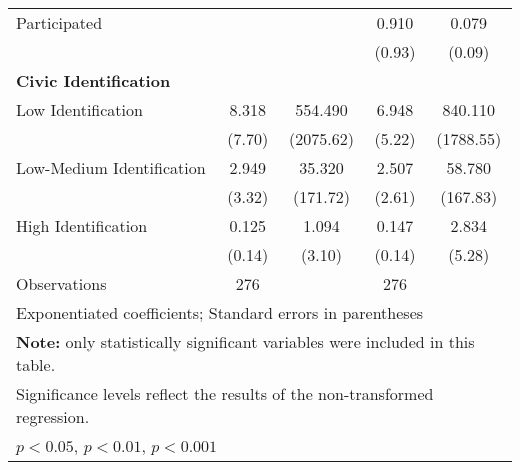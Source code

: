 \begin{table}[htbp]
\begin{tabular}{l*{4}{c}}
\hspace{0.25cm} Participated  &                   &                   &     0.910         &     0.079\sym{*}  \\
                              &                   &                   &    (0.93)         &    (0.09)         \\
\textbf{Civic Identification} &                   &                   &                   &                   \\
\hspace{0.25cm} Low Identification&     8.318\sym{*}  &   554.490         &     6.948\sym{*}  &   840.110\sym{**} \\
                              &    (7.70)         & (2075.62)         &    (5.22)         & (1788.55)         \\
\hspace{0.25cm} Low-Medium Identification&     2.949         &    35.320         &     2.507         &    58.780         \\
                              &    (3.32)         &  (171.72)         &    (2.61)         &  (167.83)         \\
\hspace{0.25cm} High Identification&     0.125         &     1.094         &     0.147         &     2.834         \\
                              &    (0.14)         &    (3.10)         &    (0.14)         &    (5.28)         \\
\midrule
Observations                  &       276         &                   &       276         &                   \\
\bottomrule
\multicolumn{5}{l}{\footnotesize Exponentiated coefficients; Standard errors in parentheses}\\
\multicolumn{5}{l}{\footnotesize \textbf{Note:} only statistically significant variables were included in this table.}\\
\multicolumn{5}{l}{\footnotesize Significance levels reflect the results of the non-transformed regression.}\\
\multicolumn{5}{l}{\footnotesize \sym{*} \(p<0.05\), \sym{**} \(p<0.01\), \sym{***} \(p<0.001\)}\\
\end{tabular}
\end{table}
